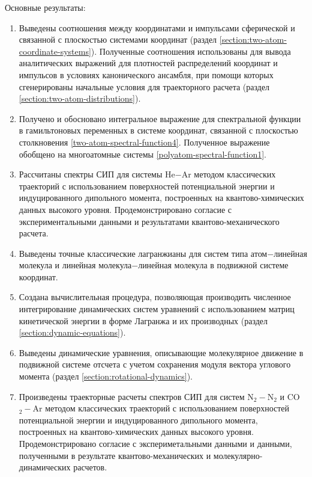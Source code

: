 Основные результаты:
\begin{enumerate}
    \item Выведены соотношения между координатами и импульсами сферической и связанной с плоскостью системами координат (раздел \ref{section:two-atom-coordinate-systems}). Полученные соотношения использованы для вывода  аналитических выражений для плотностей распределений координат и импульсов в условиях канонического ансамбля, при помощи которых сгенерированы начальные условия для траекторного расчета (раздел \ref{section:two-atom-distributions}).
    \item Получено и обосновано интегральное выражение для спектральной функции в гамильтоновых переменных в системе координат, связанной с плоскостью столкновения \eqref{two-atom-spectral-function4}. Полученное выражение обобщено на многоатомные системы \eqref{polyatom-spectral-function1}. 
    \item Рассчитаны спектры СИП для системы He$-$Ar методом классических траекторий с использованием поверхностей потенциальной энергии и индуцированного дипольного момента, построенных на квантово-химических данных высокого уровня. Продемонстрировано согласие с экспериментальными данными и результатами квантово-механического расчета. 
    \item Выведены точные классические лагранжианы для систем типа атом$-$линейная молекула и линейная молекула$-$линейная молекула в подвижной системе координат.
    \item Создана вычислительная процедура, позволяющая производить численное интегрирование динамических систем уравнений с использованием матриц кинетической энергии в форме Лагранжа и их производных (раздел \ref{section:dynamic-equations}).
    \item Выведены динамические уравнения, описывающие молекулярное движение в подвижной системе отсчета с учетом сохранения модуля вектора углового момента (раздел \ref{section:rotational-dynamics}).
    \item Произведены траекторные расчеты спектров СИП для систем N$_2-$N$_2$ и CO$_2-$Ar методом классических траекторий с использованием поверхностей потенциальной энергии и индуцированного дипольного момента, построенных на квантово-химических данных высокого уровня. Продемонстрировано согласие с экспериметальными данными и данными, полученными в результате квантово-механических и молекулярно-динамических расчетов.
\end{enumerate}

